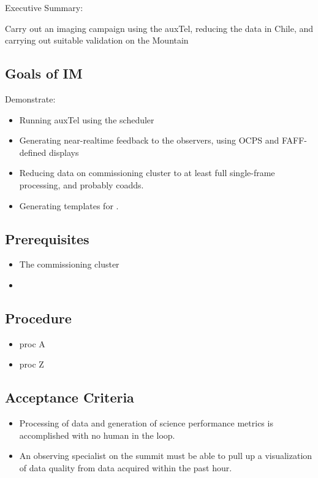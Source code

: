 
Executive Summary:

Carry out an imaging campaign using the auxTel, reducing the data in Chile, and
carrying out suitable validation on the Mountain

\subsection{Goals of IM}
Demonstrate:
\begin{itemize}
\item Running auxTel using the scheduler
\item Generating near-realtime feedback to the observers, using OCPS and FAFF-defined displays
\item Reducing data on commissioning cluster to at least full single-frame processing, and probably coadds.
\item Generating templates for .
\end{itemize}

\subsection{Prerequisites}
\begin{itemize}
\item The commissioning cluster
\item {}
\end{itemize}

\subsection{Procedure}
\begin{itemize}
\item proc A
\item proc Z
\end{itemize}

\subsection{Acceptance Criteria}
\begin{itemize}
\item Processing of data and generation of science performance metrics is accomplished with no human in the loop.
\item An observing specialist on the summit must be able to pull up a visualization of data quality from data acquired within the past hour.
\end{itemize}